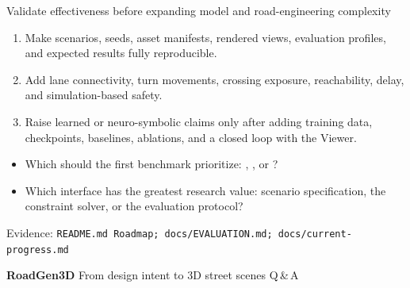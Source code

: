 \documentclass[aspectratio=169,10pt]{ctexbeamer}
\newcommand{\sourcefoot}[1]{\vfill{\tiny\color{hkustgrey}Evidence: \texttt{#1}}}
\begin{document}
\begin{frame}{Validate effectiveness before expanding model and road-engineering complexity}
  \small
  \begin{enumerate}
    \item {}\par
      Make scenarios, seeds, asset manifests, rendered views, evaluation profiles, and expected results fully reproducible.
    \item {}\par
      Add lane connectivity, turn movements, crossing exposure, reachability, delay, and simulation-based safety.
    \item {}\par
      Raise learned or neuro-symbolic claims only after adding training data, checkpoints, baselines, ablations, and a closed loop with the Viewer.
  \end{enumerate}
  \deckgap
  \begin{callout}
    \begin{itemize}
      \item Which should the first benchmark prioritize: , , or ?
      \item Which interface has the greatest research value: scenario specification, the constraint solver, or the evaluation protocol?
    \end{itemize}
  \end{callout}
  \sourcefoot{README.md Roadmap; docs/EVALUATION.md; docs/current-progress.md}
\end{frame}

\begin{frame}[plain,c]
  \centering
  {\fontsize{38}{42}\selectfont\bfseries\color{hkustblue} RoadGen3D}
  \deckgap
  {\Large From design intent to  3D street scenes}
  \deckgap
  {\large\color{hkustgrey}Q\,\&\,A}
\end{frame}

\appendix
\end{document}
